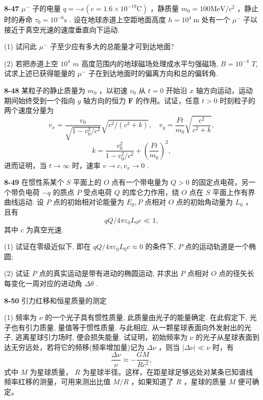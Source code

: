 \newpage

\textbf{8-47} $\mu^{-}$ 子的电量 $q = -e(e = 1.6 \times 10^{-19} \mathrm{C})$ ，静质量 $m_0 = 100 \mathrm{MeV} / c^2$ ，静止时的寿命 $\tau_0 = 10^{-6} \mathrm{s}$ . 设在地球赤道上空距地面高度 $h = 10^4 \mathrm{~m}$ 处有一个 $\mu^{-}$ 子以接近于真空光速的速度垂直向下运动.

(1) 试问此 $\mu^{-}$ 子至少应有多大的总能量才可到达地面?

(2) 若把赤道上空 $10^{4}$ $m$ 高度范围内的地球磁场处理成水平匀强磁场, $B=10^{-4}$ $T$, 试求上述已获得能量的 $\mu^{-}$ 子在到达地面时的偏离方向和总的偏转角.

\newpage

\textbf{8-48} 某粒子的静止质量为 $m_0$ ，以初速 $v_0$ 从 $t = 0$ 开始沿 $x$ 轴方向运动，运动期间始终受到一个指向 $y$ 轴方向的恒力 $\pmb{F}$ 的作用。试证，任意 $t > 0$ 时刻粒子的两个速度分量为
\[
v _ {x} = \frac {v _ {0}}{\sqrt {1 - v _ {0} ^ {2} / c ^ {2}}} \sqrt {c ^ {2} / (c ^ {2} + k)}, \quad v _ {y} = \frac {F t}{m _ {0}} \sqrt {\frac {c ^ {2}}{c ^ {2} + k}},
\]
\[
k = \frac {v _ {0} ^ {2}}{1 - v _ {0} ^ {2} / c ^ {2}} + \left(\frac {F t}{m _ {0}}\right) ^ {2},
\]
进而证明，当 $t \to \infty$ 时，速率 $v \to c, v_x \to 0$ .

\newpage

\textbf{8-49} 在惯性系某个 $S$ 平面上的 $O$ 点有一个带电量为 $Q > 0$ 的固定点电荷，另一个带负电荷 $-q$ 的质点 $P$ 受点电荷 $Q$ 的库仑力作用，绕 $O$ 点在 $S$ 平面上作有界曲线运动. 设 $P$ 点的初始相对论能量为 $E_0, P$ 点相对 $O$ 点的初始角动量为 $L_0$ ，且有
\[
q Q / 4 \pi \varepsilon_ {0} L _ {0} c \ll 1,
\]
其中 $c$ 为真空光速.

(1) 试证在零级近似下, 即在 $qQ / 4\pi \varepsilon_0 L_0 c \approx 0$ 的条件下, $P$ 点的运动轨道是一个椭圆;

(2) 试证 $P$ 点的真实运动是带有进动的椭圆运动, 并求出 $P$ 点相对 $O$ 点的径矢长每变化一周对应的进动角 $\Delta\theta$ .

\newpage

\textbf{8-50} 引力红移和恒星质量的测定

(1) 频率为 $\nu$ 的一个光子具有惯性质量, 此质量由光子的能量确定. 在此假定下, 光子也有引力质量, 量值等于惯性质量. 与此相应, 从一颗星球表面向外发射出的光子, 逃离星球引力场时, 便会损失能量.
试证明，初始频率为 $\nu$ 的光子从星球表面到达无穷远处，若将它的频移(频率增加量)记为 $\Delta \nu$ ，则当 $|\Delta \nu| \ll \nu$ 时，有
$$
\frac {\Delta \nu}{\nu} \approx - \frac {G M}{R c ^ {2}},
$$
式中 $M$ 为星球质量， $R$ 为星球半径。这样，在距星球足够远处对某条已知谱线频率红移的测量，可用来测出比值 $M / R$ ，如果知道了 $R$ ，星球的质量 $M$ 便可确定。

